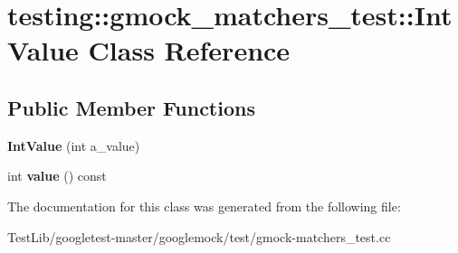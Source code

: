 \hypertarget{classtesting_1_1gmock__matchers__test_1_1IntValue}{}\section{testing\+:\+:gmock\+\_\+matchers\+\_\+test\+:\+:Int\+Value Class Reference}
\label{classtesting_1_1gmock__matchers__test_1_1IntValue}
\subsection*{Public Member Functions}
\begin{DoxyCompactItemize}
\item 
\mbox{\label{classtesting_1_1gmock__matchers__test_1_1IntValue_a2a294fcf7ad9f4d9888c4e6194fcd848}} 
{\bfseries Int\+Value} (int a\+\_\+value)
\item 
\mbox{\label{classtesting_1_1gmock__matchers__test_1_1IntValue_a6da000ea8ff787591e07ffaa3c1027d4}} 
int {\bfseries value} () const
\end{DoxyCompactItemize}


The documentation for this class was generated from the following file\+:\begin{DoxyCompactItemize}
\item 
Test\+Lib/googletest-\/master/googlemock/test/gmock-\/matchers\+\_\+test.\+cc\end{DoxyCompactItemize}
